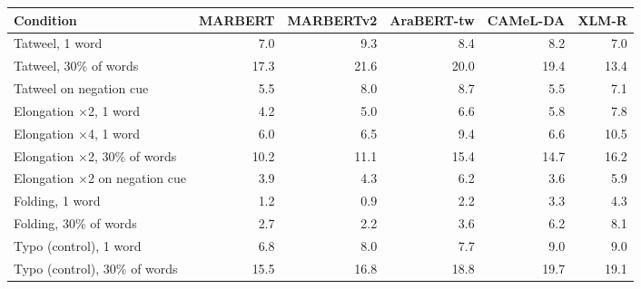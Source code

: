 \begin{tabular}{lrrrrr}
\toprule
Condition & MARBERT & MARBERTv2 & AraBERT-tw & CAMeL-DA & XLM-R \\
\midrule
Tatweel, 1 word & 7.0 & 9.3 & 8.4 & 8.2 & 7.0 \\
Tatweel, 30\% of words & 17.3 & 21.6 & 20.0 & 19.4 & 13.4 \\
Tatweel on negation cue & 5.5 & 8.0 & 8.7 & 5.5 & 7.1 \\
Elongation $\times$2, 1 word & 4.2 & 5.0 & 6.6 & 5.8 & 7.8 \\
Elongation $\times$4, 1 word & 6.0 & 6.5 & 9.4 & 6.6 & 10.5 \\
Elongation $\times$2, 30\% of words & 10.2 & 11.1 & 15.4 & 14.7 & 16.2 \\
Elongation $\times$2 on negation cue & 3.9 & 4.3 & 6.2 & 3.6 & 5.9 \\
Folding, 1 word & 1.2 & 0.9 & 2.2 & 3.3 & 4.3 \\
Folding, 30\% of words & 2.7 & 2.2 & 3.6 & 6.2 & 8.1 \\
Typo (control), 1 word & 6.8 & 8.0 & 7.7 & 9.0 & 9.0 \\
Typo (control), 30\% of words & 15.5 & 16.8 & 18.8 & 19.7 & 19.1 \\
\bottomrule
\end{tabular}
